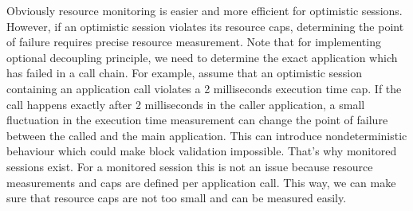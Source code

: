 Obviously resource monitoring is easier and more efficient for optimistic sessions. However, if
an optimistic session violates its resource caps, determining the point of failure requires precise resource
measurement. Note that for implementing optional decoupling principle, we need to determine the exact application
which has failed in a call chain. For example, assume that an optimistic session containing an application call
violates a 2 milliseconds execution time cap. If the call happens exactly after 2 milliseconds
in the caller application, a small fluctuation in the execution time measurement can
change the point of failure between the called and the main application. This can introduce nondeterministic
behaviour which could make block validation impossible. That's why monitored sessions exist. For a monitored session
this is not an issue because resource measurements and caps are defined per application call. This way, we can make
sure that resource caps are not too small and can be measured easily.

